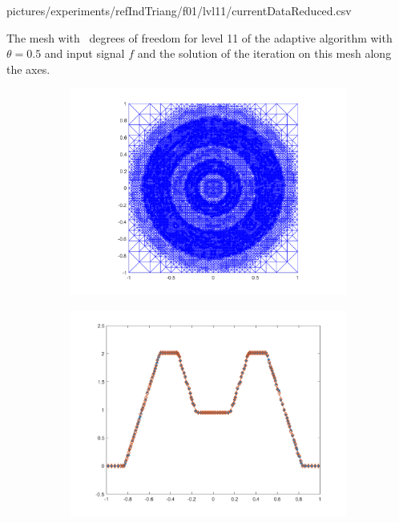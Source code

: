 {pictures/experiments/refIndTriang/f01/lvl11/currentDataReduced.csv}

\begin{frame}
  The mesh with \nrDof\ degrees of freedom for level 11 of the adaptive
  algorithm with $\theta = 0.5$ and input signal $f$ and the solution of the
  iteration on this mesh along the axes.

  \begin{figure}[!ht]
    \centering
    \begin{subfigure}{.6\linewidth}
      \includegraphics[trim = 100 30 20 20, clip,width=\linewidth]
        {pictures/experiments/refIndTriang/f01/lvl11/triangulation.png}
    \end{subfigure}
    \hspace{-1.2cm}
    \begin{subfigure}{.4\linewidth}
      \includegraphics[trim = 50 30 50 20, clip, width=\linewidth]
        {pictures/experiments/refIndTriang/f01/lvl11/solutionAxis.png}
    \end{subfigure}
  \end{figure}
\end{frame}

